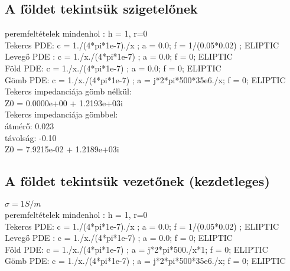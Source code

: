 \subsection{A földet tekintsük szigetelőnek}

peremfeltételek mindenhol : h = 1, r=0\\
Tekercs PDE: c = 1./(4*pi*1e-7)./x ; a = 0.0; f = 1/(0.05*0.02) ; ELIPTIC \\
Levegő PDE : c = 1./x./(4*pi*1e-7) ; a = 0.0; f = 0; ELIPTIC \\
Föld PDE:    c = 1./x./(4*pi*1e-7) ; a = 0.0; f = 0; ELIPTIC \\
Gömb PDE:    c = 1./x./(4*pi*1e-7) ; a = j*2*pi*500*35e6./x; f = 0; ELIPTIC \\

Tekercs impedanciája gömb nélkül:\\
Z0 = 0.0000e+00 + 1.2193e+03i\\

Tekercs impedanciája gömbbel:\\
átmérő: 0.023 \\
távolság: -0.10 \\
Z0 = 7.9215e-02 + 1.2189e+03i\\

\subsection{A földet tekintsük vezetőnek (kezdetleges)}
$\sigma = 1 S/m$\\
peremfeltételek mindenhol : h = 1, r=0\\
Tekercs PDE: c = 1./(4*pi*1e-7)./x ; a = 0.0; f = 1/(0.05*0.02) ; ELIPTIC \\
Levegő PDE : c = 1./x./(4*pi*1e-7) ; a = 0.0; f = 0; ELIPTIC \\
Föld PDE:    c = 1./x./(4*pi*1e-7) ; a = j*2*pi*500./x*1; f = 0; ELIPTIC \\
Gömb PDE:    c = 1./x./(4*pi*1e-7) ; a = j*2*pi*500*35e6./x; f = 0; ELIPTIC \\